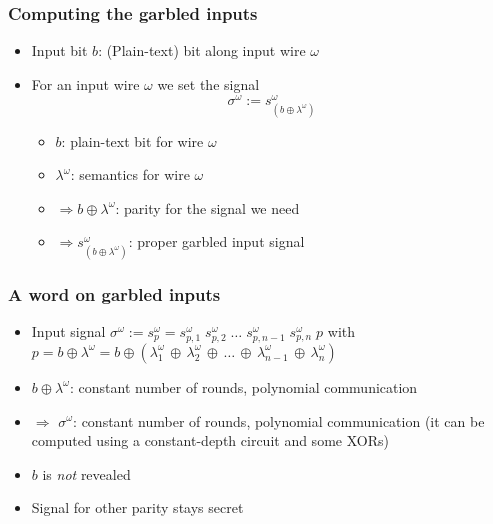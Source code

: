 \documentclass{beamer}
\begin{document}
\begin{frame}
  \frametitle{Computing the garbled inputs}
  \begin{itemize}
  \item Input bit $b$: (Plain-text) bit along input wire $\omega$
  \item For an input wire $\omega$ we set the signal
    \begin{equation}
      \sigma^\omega := s^\omega_{(b\oplus\lambda^\omega)}
    \end{equation}
    \begin{itemize}
    \item $b$: plain-text bit for wire $\omega$
    \item $\lambda^\omega$: semantics for wire $\omega$
    \item $\Rightarrow b \oplus \lambda^\omega$: parity for the signal we need
    \item $\Rightarrow s^\omega_{(b\oplus\lambda^\omega)}$: proper garbled input signal
    \end{itemize}
  \end{itemize}
\end{frame}

\begin{frame}
  \frametitle{A word on garbled inputs}
  \begin{itemize}
  \item Input signal $\sigma^\omega := s^\omega_{p} =   
    s_{p,1}^\omega \; s_{p,2}^\omega \; \dots \; s_{p,n-1}^\omega \; s_{p,n}^\omega \; p$ with $p=b\oplus\lambda^\omega = b \oplus ( \lambda_1^\omega \, \oplus \, \lambda_2^\omega \, \oplus \, \dots \, \oplus \, \lambda_{n-1}^\omega \, \oplus \, \lambda_n^\omega)$
  \item $b\oplus \lambda^\omega$: constant number of rounds, polynomial communication
  \item $\Rightarrow$ $\sigma^\omega$: constant number of rounds, polynomial communication (it can be computed using a constant-depth circuit and some XORs)
  \item $b$ is \emph{not} revealed
  \item Signal for other parity stays secret
  \end{itemize}
\end{frame}
\end{document}
